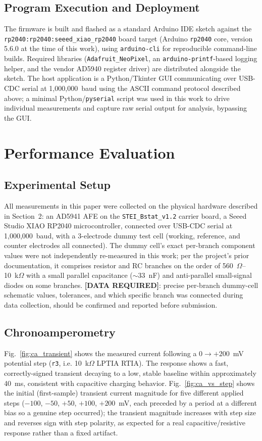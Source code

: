 \documentclass[preprint,12pt]{elsarticle}
\begin{document}
\subsection{Program Execution and Deployment}
The firmware is built and flashed as a standard Arduino IDE sketch against the \texttt{rp2040:rp2040:seeed\_xiao\_rp2040} board target (Arduino \texttt{rp2040} core, version 5.6.0 at the time of this work), using \texttt{arduino-cli} for reproducible command-line builds. Required libraries (\texttt{Adafruit\_NeoPixel}, an \texttt{arduino-printf}-based logging helper, and the vendor AD5940 register driver) are distributed alongside the sketch. The host application is a Python/Tkinter GUI communicating over USB-CDC serial at 1{,}000{,}000~baud using the ASCII command protocol described above; a minimal Python/\texttt{pyserial} script was used in this work to drive individual measurements and capture raw serial output for analysis, bypassing the GUI.

\section{Performance Evaluation}

\subsection{Experimental Setup}
All measurements in this paper were collected on the physical hardware described in Section~2: an AD5941 AFE on the \texttt{STEI\_Bstat\_v1.2} carrier board, a Seeed Studio XIAO RP2040 microcontroller, connected over USB-CDC serial at 1{,}000{,}000~baud, with a 3-electrode dummy test cell (working, reference, and counter electrodes all connected). The dummy cell's exact per-branch component values were not independently re-measured in this work; per the project's prior documentation, it comprises resistor and RC branches on the order of 560~$\Omega$--10~k$\Omega$ with a small parallel capacitance ($\sim$33~nF) and anti-parallel small-signal diodes on some branches. \textbf{[DATA REQUIRED]}: precise per-branch dummy-cell schematic values, tolerances, and which specific branch was connected during data collection, should be confirmed and reported before submission.

\subsection{Chronoamperometry}
Fig.~\ref{fig:ca_transient} shows the measured current following a $0\rightarrow+200$~mV potential step (\texttt{r3}, i.e. 10~k$\Omega$ LPTIA RTIA). The response shows a fast, correctly-signed transient decaying to a low, stable baseline within approximately 40~ms, consistent with capacitive charging behavior. Fig.~\ref{fig:ca_vs_step} shows the initial (first-sample) transient current magnitude for five different applied steps ($-100$, $-50$, $+50$, $+100$, $+200$~mV, each preceded by a period at a different bias so a genuine step occurred); the transient magnitude increases with step size and reverses sign with step polarity, as expected for a real capacitive/resistive response rather than a fixed artifact.
\end{document}
